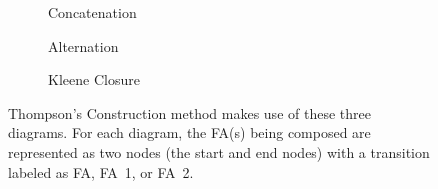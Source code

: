 \documentclass[letterpaper,12pt,openany,reqno]{book}%
\newcommand{\faterminalnode}[3] {\node at (#1) (#2) [circle, draw, double, minimum size=24pt] {#2};}
\newcommand{\fastart}[1] {\coordinate (start) at (#1);}
\newcommand{\fanonterminalnode}[2] {\node at (#1) (#2) [circle, draw, minimum size=24pt] {#2};}
\newcommand{\fatransition}[3] {\draw [->] (#1) -- (#2) node [midway, above] {#3};}
\newcommand{\faarctransition}[5] {\draw [->] (#1) to[out=#4, in=#5] node  [midway, above] {#3} (#2) ;}
\begin{document}
\begin{figure}[htb]
\centering

\begin{subfigure}[b]{0.45\textwidth}
\centering
{}
\caption{Concatenation}\label{F.Thompsons.Concatenation}
\end{subfigure}

\begin{subfigure}[b]{0.45\textwidth}
\centering
{}
\caption{Alternation}\label{F.Thompsons.Alternation}
\end{subfigure}

\begin{subfigure}[b]{0.45\textwidth}
\centering
\caption{Kleene Closure}\label{F.Thompsons.KleeneClosure}
\end{subfigure}

 \caption[Thompson's Construction]{Thompson's Construction method makes use of these three diagrams. For each diagram, the FA(s) being composed are represented as two nodes (the start and end nodes) with a transition labeled as FA, FA~1, or FA~2.}
  \label{F.Thompsons}
\end{figure}
\end{document}
